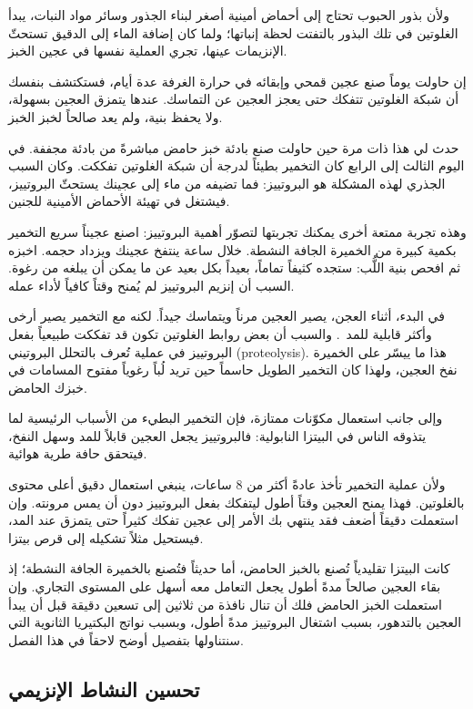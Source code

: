 ولأن بذور الحبوب تحتاج إلى أحماض أمينية أصغر لبناء الجذور وسائر مواد النبات، يبدأ الغلوتين في تلك البذور بالتفتت لحظة إنباتها؛ ولما كان إضافة الماء إلى الدقيق تستحثّ الإنزيمات عينها، تجري العملية نفسها في عجين الخبز.

إن حاولت يوماً صنع عجين قمحي وإبقائه في حرارة الغرفة عدة أيام، فستكتشف بنفسك أن شبكة الغلوتين تتفكك حتى يعجز العجين عن التماسك. عندها يتمزق العجين بسهولة، ولا يحفظ بنية، ولم يعد صالحاً لخبز الخبز.

حدث لي هذا ذات مرة حين حاولت صنع بادئة خبز حامض مباشرةً من بادئة مجففة. في اليوم الثالث إلى الرابع كان التخمير بطيئاً لدرجة أن شبكة الغلوتين تفككت. وكان السبب الجذري لهذه المشكلة هو البروتييز: فما تضيفه من ماء إلى عجينك يستحثّ البروتييز، فيشتغل في تهيئة الأحماض الأمينية للجنين.

وهذه تجربة ممتعة أخرى يمكنك تجربتها لتصوّر أهمية البروتييز: اصنع عجيناً سريع التخمير بكمية كبيرة من الخميرة الجافة النشطة. خلال  ساعة ينتفخ عجينك ويزداد حجمه. اخبزه ثم افحص بنية اللُّب: ستجده كثيفاً تماماً، بعيداً بكل بعيد عن ما يمكن أن يبلغه من رغوة. السبب أن إنزيم البروتييز لم يُمنح وقتاً كافياً لأداء عمله.

في البدء، أثناء العجن، يصير العجين مرناً ويتماسك جيداً. لكنه مع التخمير يصير أرخى وأكثر قابلية للمد~\cite{protease+enzyme+bread}. والسبب أن بعض روابط الغلوتين تكون قد تفككت طبيعياً بفعل البروتييز في عملية تُعرف بالتحلل البروتيني \textenglish{(proteolysis)}. هذا ما ييسّر على الخميرة نفخ العجين، ولهذا كان التخمير الطويل حاسماً حين تريد لُباً رغوياً مفتوح المسامات في خبزك الحامض.

وإلى جانب استعمال مكوّنات ممتازة، فإن التخمير البطيء من الأسباب الرئيسية لما يتذوقه الناس في البيتزا النابولية: فالبروتييز يجعل العجين قابلاً للمد وسهل النفخ، فيتحقق حافة طرية هوائية.

ولأن عملية التخمير تأخذ عادةً أكثر من 8 ساعات، ينبغي استعمال دقيق أعلى محتوى بالغلوتين. فهذا يمنح العجين وقتاً أطول ليتفكك بفعل البروتييز دون أن يمس مرونته. وإن استعملت دقيقاً أضعف فقد ينتهي بك الأمر إلى عجين تفكك كثيراً حتى يتمزق عند المد، فيستحيل مثلاً تشكيله إلى قرص بيتزا.

كانت البيتزا تقليدياً تُصنع بالخبز الحامض، أما حديثاً فتُصنع بالخميرة الجافة النشطة؛ إذ بقاء العجين صالحاً مدةً أطول يجعل التعامل معه أسهل على المستوى التجاري. وإن استعملت الخبز الحامض فلك أن تنال نافذة من ثلاثين إلى تسعين دقيقة قبل أن يبدأ العجين بالتدهور، بسبب اشتغال البروتييز مدةً أطول، وبسبب نواتج البكتيريا الثانوية التي سنتناولها بتفصيل أوضح لاحقاً في هذا الفصل.

\subsection{تحسين النشاط الإنزيمي}

